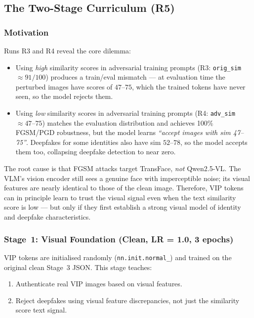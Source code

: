 \documentclass[12pt,a4paper]{article}
\begin{document}
\subsection{The Two-Stage Curriculum (R5)}

\subsubsection*{Motivation}

Runs R3 and R4 reveal the core dilemma:

\begin{itemize}[leftmargin=*]
  \item Using \emph{high} similarity scores in adversarial training prompts
  (R3: \texttt{orig\_sim} $\approx 91/100$) produces a train/eval mismatch ---
  at evaluation time the perturbed images have scores of $47$--$75$, which
  the trained tokens have never seen, so the model rejects them.

  \item Using \emph{low} similarity scores in adversarial training prompts
  (R4: \texttt{adv\_sim} $\approx 47$--$75$) matches the evaluation distribution
  and achieves 100\% FGSM/PGD robustness, but the model learns \emph{``accept
  images with sim 47--75''}.  Deepfakes for some identities also have sim
  $52$--$78$, so the model accepts them too, collapsing deepfake detection to
  near zero.
\end{itemize}

The root cause is that FGSM attacks target TransFace, \emph{not} Qwen2.5-VL.
The VLM's vision encoder still sees a genuine face with imperceptible noise;
its visual features are nearly identical to those of the clean image.  Therefore,
VIP tokens can in principle learn to trust the visual signal even when the text
similarity score is low --- but only if they first establish a strong visual
model of identity and deepfake characteristics.

\subsubsection*{Stage~1: Visual Foundation (Clean, LR = 1.0, 3 epochs)}

VIP tokens are initialised randomly (\texttt{nn.init.normal\_}) and trained on
the original clean Stage~3 JSON.  This stage teaches:

\begin{enumerate}[leftmargin=*]
  \item Authenticate real VIP images based on visual features.
  \item Reject deepfakes using visual feature discrepancies, not just the
        similarity score text signal.
\end{enumerate}
\end{document}
